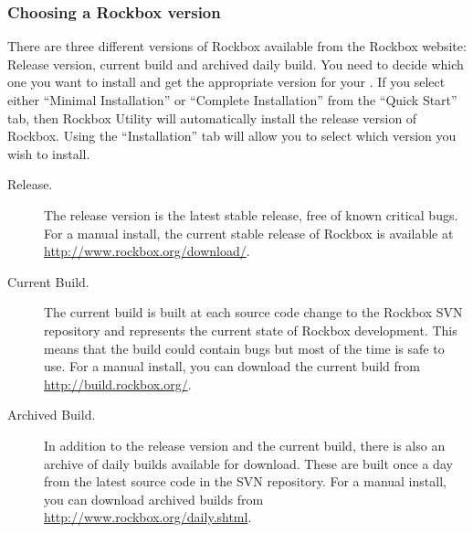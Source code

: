 \subsubsection{Choosing a Rockbox version}\label{sec:choosing_version}

There are three different versions of Rockbox available from the
Rockbox website:
\label{Version}
Release version, current build and archived daily build. You need to decide which one
you want to install and get the appropriate version for your \dap{}. If you
select either ``Minimal Installation'' or ``Complete Installation'' from the
``Quick Start'' tab, then Rockbox Utility will automatically install the
release version of Rockbox. Using the ``Installation'' tab will allow you
to select which version you wish to install.

\begin{description}

\item[Release.] The release version is the latest stable release, free
   of known critical bugs. For a manual install, the current stable release of Rockbox is
   available at \url{http://www.rockbox.org/download/}.
  
\item[Current Build.] The current build is built at each source code change to
  the Rockbox SVN repository and represents the current state of Rockbox
  development. This means that the build could contain bugs but most of
  the time is safe to use. For a manual install, you can download the current build from  
  \url{http://build.rockbox.org/}.

\item[Archived Build.] In addition to the release version and the current build,
  there is also an archive of daily builds available for download. These are
  built once a day from the latest source code in the SVN repository. For a manual install,
  you can download archived builds from \url{http://www.rockbox.org/daily.shtml}.

\end{description}


